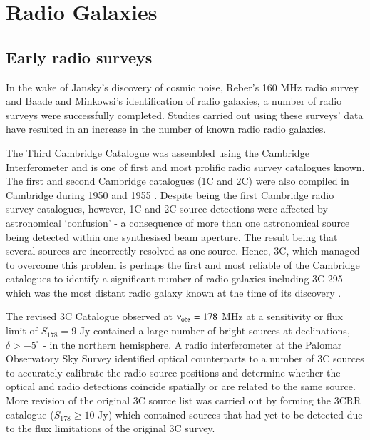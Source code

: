 \section{Radio Galaxies} 
\subsection{Early radio surveys}
In the wake of Jansky's discovery of cosmic noise, Reber's 160 MHz radio survey and Baade and Minkowsi's identification of radio galaxies, a number of radio surveys were successfully completed. Studies carried out using these surveys' data have resulted in an increase in the number of known radio radio galaxies. 

The Third Cambridge Catalogue \citep[3C;][]{Edge1959} was assembled using the Cambridge Interferometer and is one of first and most prolific radio survey catalogues known. The first and second Cambridge catalogues (1C and 2C) were also compiled in Cambridge during 1950 \citep{Ryle1950} and 1955 \citep{Shakeshaft1955}. Despite being the first Cambridge radio survey catalogues, however, 1C and 2C source detections were affected by astronomical `confusion' - a consequence of more than one astronomical source being detected within one synthesised beam aperture. The result being that several sources are incorrectly resolved as one source. Hence, 3C, which managed to overcome this problem is perhaps the first and most reliable of the Cambridge catalogues to identify a significant number of radio galaxies including 3C 295 which was the most distant radio galaxy known at the time of its discovery \citep{Minkowski1960}. 

The revised 3C Catalogue \citep[3CR;][]{Leslie1961,Bennett1962} observed at $\nu_{\rm obs} = 178$ MHz at a sensitivity or flux limit of $S_{178} = 9$ Jy contained a large number of bright sources at declinations, $\delta > -5^{\circ}$ - in the northern hemisphere. A radio interferometer at the Palomar Observatory Sky Survey \citep[POSS;][]{Veron1966} identified optical counterparts to a number of 3C sources to accurately calibrate the radio source positions and determine whether the optical and radio detections coincide spatially or are related to the same source. More revision of the original 3C source list was carried out by \citet{LaingRileyLongair1983} forming the 3CRR catalogue ($S_{178} \geq 10$ Jy) which contained sources that had yet to be detected due to the flux limitations of the original 3C survey. 

